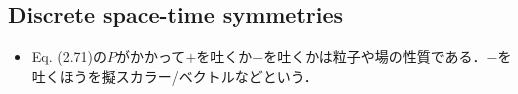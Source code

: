 \subsection{Discrete space-time symmetries}
\begin{itemize}
		\item Eq. (2.71)の$P $がかかって$+ $を吐くか$- $を吐くかは粒子や場の性質である．$- $を吐くほうを擬スカラー/ベクトルなどという．
\end{itemize}

